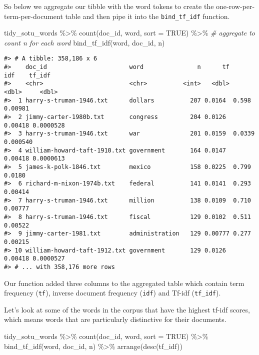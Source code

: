 \documentclass[
]{book}
\newenvironment{Shaded}{\begin{snugshade}}{\end{snugshade}}
\newcommand{\AttributeTok}[1]{\textcolor[rgb]{0.77,0.63,0.00}{#1}}
\newcommand{\CommentTok}[1]{\textcolor[rgb]{0.56,0.35,0.01}{\textit{#1}}}
\newcommand{\ConstantTok}[1]{\textcolor[rgb]{0.00,0.00,0.00}{#1}}
\newcommand{\FunctionTok}[1]{\textcolor[rgb]{0.00,0.00,0.00}{#1}}
\newcommand{\NormalTok}[1]{#1}
\newcommand{\SpecialCharTok}[1]{\textcolor[rgb]{0.00,0.00,0.00}{#1}}
\begin{document}
So below we aggregate our tibble with the word tokens to create the one-row-per-term-per-document table and then pipe it into the \texttt{bind\_tf\_idf} function.

\begin{Shaded}
\begin{Highlighting}[]
\NormalTok{tidy\_sotu\_words }\SpecialCharTok{\%\textgreater{}\%}
  \FunctionTok{count}\NormalTok{(doc\_id, word, }\AttributeTok{sort =} \ConstantTok{TRUE}\NormalTok{)  }\SpecialCharTok{\%\textgreater{}\%}  \CommentTok{\# aggregate to count n for each word}
  \FunctionTok{bind\_tf\_idf}\NormalTok{(word, doc\_id, n) }
\end{Highlighting}
\end{Shaded}

\begin{verbatim}
#> # A tibble: 358,186 x 6
#>    doc_id                       word               n      tf     idf    tf_idf
#>    <chr>                        <chr>          <int>   <dbl>   <dbl>     <dbl>
#>  1 harry-s-truman-1946.txt      dollars          207 0.0164  0.598   0.00981  
#>  2 jimmy-carter-1980b.txt       congress         204 0.0126  0.00418 0.0000528
#>  3 harry-s-truman-1946.txt      war              201 0.0159  0.0339  0.000540 
#>  4 william-howard-taft-1910.txt government       164 0.0147  0.00418 0.0000613
#>  5 james-k-polk-1846.txt        mexico           158 0.0225  0.799   0.0180   
#>  6 richard-m-nixon-1974b.txt    federal          141 0.0141  0.293   0.00414  
#>  7 harry-s-truman-1946.txt      million          138 0.0109  0.710   0.00777  
#>  8 harry-s-truman-1946.txt      fiscal           129 0.0102  0.511   0.00522  
#>  9 jimmy-carter-1981.txt        administration   129 0.00777 0.277   0.00215  
#> 10 william-howard-taft-1912.txt government       129 0.0126  0.00418 0.0000527
#> # ... with 358,176 more rows
\end{verbatim}

Our function added three columns to the aggregated table which contain term frequency (\texttt{tf}), inverse document frequency (\texttt{idf}) and Tf-idf (\texttt{tf\_idf}).

Let's look at some of the words in the corpus that have the highest tf-idf scores, which means words that are particularly distinctive for their documents.

\begin{Shaded}
\begin{Highlighting}[]
\NormalTok{tidy\_sotu\_words }\SpecialCharTok{\%\textgreater{}\%}
  \FunctionTok{count}\NormalTok{(doc\_id, word, }\AttributeTok{sort =} \ConstantTok{TRUE}\NormalTok{)  }\SpecialCharTok{\%\textgreater{}\%} 
  \FunctionTok{bind\_tf\_idf}\NormalTok{(word, doc\_id, n) }\SpecialCharTok{\%\textgreater{}\%} 
  \FunctionTok{arrange}\NormalTok{(}\FunctionTok{desc}\NormalTok{(tf\_idf))}
\end{Highlighting}
\end{Shaded}
\end{document}
